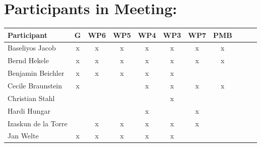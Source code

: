 \documentclass[a4paper, 11pt]{article}
\begin{document}
\section{Participants in Meeting:}

\begin{tabular}{|l|c|c|c|c||c|c|c||c|c|c|}
\hline
\textbf{Participant}  & \textbf{G} & \textbf{WP6} &  \textbf{WP5} & \textbf{WP4}&  \textbf{WP3} & \textbf{WP7}&  \textbf{PMB} \\\hline
Baseliyos Jacob       & x & x & x & x & x & x & x \\\hline 
Bernd Hekele         & x & x & x & x & x & x & x \\\hline
Benjamin Beichler    & x & x & x & x & x &   &   \\\hline
Cecile Braunstein    & x &   &   & x & x & x & x \\\hline
Christian Stahl      &   &   &   &   & x &   &   \\\hline
Hardi Hungar         &  &   &   & x &   & x &   \\\hline
Izaskun de la Torre  &  & x & x & x & x & x &   \\\hline
Jan Welte            & x & x & x & x & x &   &   \\\hline

\end{tabular}
\end{document}
